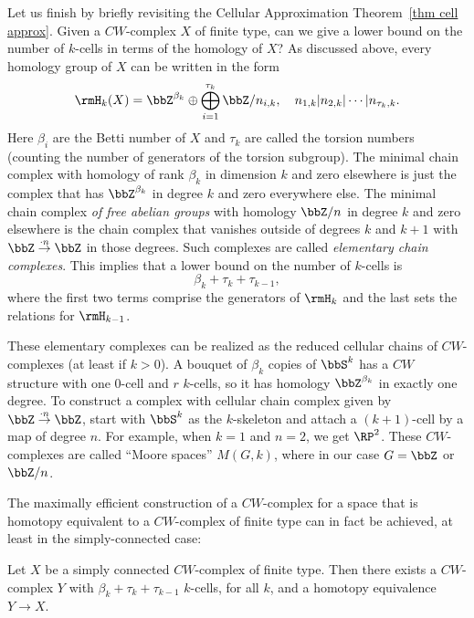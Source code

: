 Let us finish by briefly revisiting the Cellular Approximation Theorem~\ref{thm cell approx}. Given a $CW$-complex $X$ of finite type, can we give a lower bound on the number of $k$-cells in terms of the homology of $X$? As discussed above, every homology group of $X$ can be written in the form
\[\rmH_k(X)=\bbZ^{\beta_k}\oplus \bigoplus_{i=1}^{\tau_k}\bbZ\slash n_{i,k},\quad n_{1,k}|n_{2,k}|\cdots |n_{\tau_k,k}.\]
Here $\beta_i$ are the Betti number of $X$ and $\tau_k$ are called the torsion numbers (counting the number of generators of the torsion subgroup). The minimal chain complex with homology of rank $\beta_k$ in dimension $k$ and zero elsewhere is just the complex that has $\bbZ^{\beta_k}$ in degree $k$ and zero everywhere else. The minimal chain complex \emph{of free abelian groups} with homology $\bbZ\slash n$ in degree $k$ and zero elsewhere is the chain complex that vanishes outside of degrees $k$ and $k+1$ with $\bbZ\overset{\cdot n}{\to}\bbZ$ in those degrees. Such complexes are called \emph{elementary chain complexes}. This implies that a lower bound on the number of $k$-cells is
\[\beta_k+\tau_k+\tau_{k-1},\]
where the first two terms comprise the generators of $\rmH_k$ and the last sets the relations for $\rmH_{k-1}$.

These elementary complexes can be realized as the reduced cellular chains of $CW$-complexes (at least if $k>0$). A bouquet of $\beta_k$ copies of $\bbS^k$ has a $CW$ structure with one $0$-cell and $r$ $k$-cells, so it has homology $\bbZ^{\beta_k}$ in exactly one degree. To construct a complex with cellular chain complex given by $\bbZ\overset{\cdot n}{\to}\bbZ$, start with $\bbS^k$ as the $k$-skeleton and attach a $(k+1)$-cell by a map of degree $n$. For example, when $k=1$ and $n=2$, we get $\RP^2$. These $CW$-complexes are called ``Moore spaces'' $M(G,k)$, where in our case $G=\bbZ$ or $\bbZ\slash n$.

The maximally efficient construction of a $CW$-complex for a space that is homotopy equivalent to a $CW$-complex of finite type can in fact be achieved, at least in the simply-connected case:

\begin{thm}[C.T.C.~Wall]
    Let $X$ be a simply connected $CW$-complex of finite type. Then there exists a $CW$-complex $Y$ with $\beta_k+\tau_k+\tau_{k-1}$ $k$-cells, for all $k$, and a homotopy equivalence $Y\to X$.
\end{thm}


